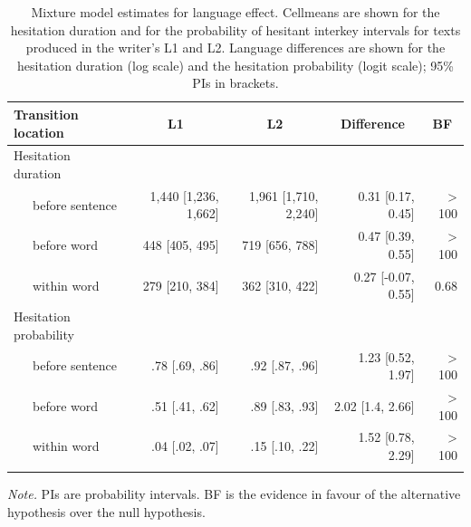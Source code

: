 \documentclass[
  man,floatsintext]{apa7}
\begin{document}
\begin{table}[tbp]

\begin{center}
\begin{threeparttable}

\caption{\label{tab:l2effect}Mixture model estimates for language effect. Cellmeans are shown for the hesitation duration and for the probability of hesitant interkey intervals for texts produced in the writer's L1 and L2. Language differences are shown for the hesitation duration (log scale) and the hesitation probability (logit scale); 95\% PIs in brackets.}

\small{

\begin{tabular}{lrrrr}
\toprule
Transition location & \multicolumn{1}{c}{L1} & \multicolumn{1}{c}{L2} & \multicolumn{1}{c}{Difference} & \multicolumn{1}{c}{BF}\\
\midrule
Hesitation duration &  &  &  & \\
\ \ \ before sentence & 1,440 [1,236, 1,662] & 1,961 [1,710, 2,240] & 0.31 [0.17, 0.45] & > 100\\
\ \ \ before word & 448 [405, 495] & 719 [656, 788] & 0.47 [0.39, 0.55] & > 100\\
\ \ \ within word & 279 [210, 384] & 362 [310, 422] & 0.27 [-0.07, 0.55] & 0.68\\
Hesitation probability &  &  &  & \\
\ \ \ before sentence & .78 [.69, .86] & .92 [.87, .96] & 1.23 [0.52, 1.97] & > 100\\
\ \ \ before word & .51 [.41, .62] & .89 [.83, .93] & 2.02 [1.4, 2.66] & > 100\\
\ \ \ within word & .04 [.02, .07] & .15 [.10, .22] & 1.52 [0.78, 2.29] & > 100\\
\bottomrule
\addlinespace
\end{tabular}

}

\begin{tablenotes}[para]
\normalsize{\textit{Note.} PIs are probability intervals. BF is the evidence in favour of the alternative hypothesis over the null hypothesis.}
\end{tablenotes}

\end{threeparttable}
\end{center}

\end{table}

\newpage
\end{document}
